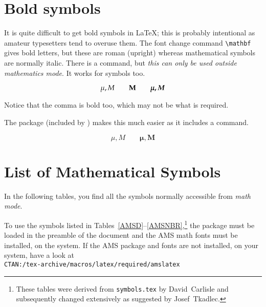 \section{Bold symbols}

It is quite difficult to get bold symbols in \LaTeX{}; this is 
probably intentional as amateur typesetters tend to overuse them.
The font change command \verb|\mathbf| gives bold letters, but these are
roman (upright) whereas mathematical symbols are normally italic.
There is a  command, but \emph{this can only be
used outside mathematics mode}. It works for symbols too.

\begin{singlespace}
\begin{example}
\begin{displaymath}\label{boldmath}
\mu, M \qquad \mathbf{M} \qquad
\mbox{\boldmath $\mu, M$}
\end{displaymath}
\end{example}
\end{singlespace}

\noindent
Notice that the comma is bold too, which may not be what is required.

The package  (included by ) makes this much
easier as it includes a  command.

\ifx\boldsymbol\undefined\else
\begin{singlespace}
\begin{example}
\begin{displaymath}\label{boldsymbol}
\mu, M \qquad
\boldsymbol{\mu}, \boldsymbol{M}
\end{displaymath}
\end{example}
\end{singlespace}
\fi

\section{List of Mathematical Symbols}  \label{symbols}
 
In the following tables, you find all the symbols normally accessible
from \emph{math mode}.  

%
%
\ifx\noAMS\relax To use the symbols listed in
Tables~\ref{AMSD}--\ref{AMSNBR},\footnote{These tables were derived
  from \texttt{symbols.tex} by David~Carlisle and subsequently changed
extensively as suggested by Josef~Tkadlec.} the package
 must be loaded in the preamble of the document and the
AMS math fonts must be installed, on the system. If the AMS package and
fonts are not installed, on your system, have a look at\\ 
\texttt{CTAN:/tex-archive/macros/latex/required/amslatex}\fi
 
